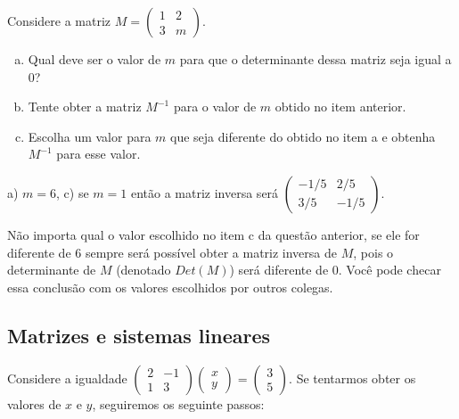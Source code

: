 \documentclass[main_estudante.tex]{subfiles}
\begin{document}
\begin{questao}
Considere a matriz $M=\begin{pmatrix}1 & 2 \\ 3 & m\end{pmatrix}$.
\begin{enumerate}[a)]
\item Qual deve ser o valor de $m$ para que o determinante dessa matriz seja igual a 0?
\item Tente obter a matriz $M^{-1}$ para o valor de $m$ obtido no item anterior.
\item Escolha um valor para $m$ que seja diferente do obtido no item a e obtenha $M^{-1}$ para esse valor.
\end{enumerate}
\end{questao}

\begin{gabarito}
	\begin{gabaritoQuestao}
		a) $m=6$, c) se $m=1$ então a matriz inversa será $\begin{pmatrix} -1/5 & 2/5 \\ 3/5 & -1/5 \end{pmatrix}$.
	\end{gabaritoQuestao}
\end{gabarito}

Não importa qual o valor escolhido no item c da questão anterior, se ele for diferente de 6 sempre será possível obter a matriz inversa de $M$, pois o determinante de $M$ (denotado $Det(M)$) será diferente de 0. Você pode checar essa conclusão com os valores escolhidos por outros colegas.

\subsection*{Matrizes e sistemas lineares}

Considere a igualdade $\begin{pmatrix}2 & -1 \\ 1 & 3\end{pmatrix} \begin{pmatrix}x \\ y\end{pmatrix} = \begin{pmatrix}3 \\ 5\end{pmatrix}$. Se tentarmos obter os valores de $x$ e $y$, seguiremos os seguinte passos:
\end{document}
